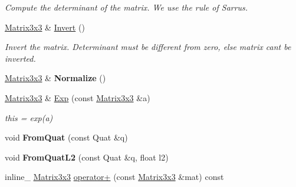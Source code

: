 \begin{DoxyCompactItemize}
\begin{DoxyCompactList}\small\item\em Compute the determinant of the matrix. We use the rule of Sarrus. \end{DoxyCompactList}\item 
\hyperlink{classOpcode_1_1Matrix3x3}{Matrix3x3} \& \hyperlink{classOpcode_1_1Matrix3x3_a7a4cccdd5303d65cea1c282de7a9e5d3}{Invert} ()\hypertarget{classOpcode_1_1Matrix3x3_a7a4cccdd5303d65cea1c282de7a9e5d3}{}\label{classOpcode_1_1Matrix3x3_a7a4cccdd5303d65cea1c282de7a9e5d3}

\begin{DoxyCompactList}\small\item\em Invert the matrix. Determinant must be different from zero, else matrix can\textquotesingle{}t be inverted. \end{DoxyCompactList}\item 
\hyperlink{classOpcode_1_1Matrix3x3}{Matrix3x3} \& {\bfseries Normalize} ()\hypertarget{classOpcode_1_1Matrix3x3_a94e0e0c124cd5a8674de31a4dd6ff461}{}\label{classOpcode_1_1Matrix3x3_a94e0e0c124cd5a8674de31a4dd6ff461}

\item 
\hyperlink{classOpcode_1_1Matrix3x3}{Matrix3x3} \& \hyperlink{classOpcode_1_1Matrix3x3_a448f5cf2649cec9fe81640fc6792a320}{Exp} (const \hyperlink{classOpcode_1_1Matrix3x3}{Matrix3x3} \&a)\hypertarget{classOpcode_1_1Matrix3x3_a448f5cf2649cec9fe81640fc6792a320}{}\label{classOpcode_1_1Matrix3x3_a448f5cf2649cec9fe81640fc6792a320}

\begin{DoxyCompactList}\small\item\em this = exp(a) \end{DoxyCompactList}\item 
void {\bfseries From\+Quat} (const Quat \&q)\hypertarget{classOpcode_1_1Matrix3x3_ac274e46a4027686aaea3785cc01d96f1}{}\label{classOpcode_1_1Matrix3x3_ac274e46a4027686aaea3785cc01d96f1}

\item 
void {\bfseries From\+Quat\+L2} (const Quat \&q, float l2)\hypertarget{classOpcode_1_1Matrix3x3_ab9b00bc04499850fac3b14776ad49021}{}\label{classOpcode_1_1Matrix3x3_ab9b00bc04499850fac3b14776ad49021}

\item 
inline\+\_\+ \hyperlink{classOpcode_1_1Matrix3x3}{Matrix3x3} \hyperlink{classOpcode_1_1Matrix3x3_ae675e0484b5c7499ab7bc6c0ecf3a57e}{operator+} (const \hyperlink{classOpcode_1_1Matrix3x3}{Matrix3x3} \&mat) const \hypertarget{classOpcode_1_1Matrix3x3_ae675e0484b5c7499ab7bc6c0ecf3a57e}{}\label{classOpcode_1_1Matrix3x3_ae675e0484b5c7499ab7bc6c0ecf3a57e}


\end{DoxyCompactItemize}
